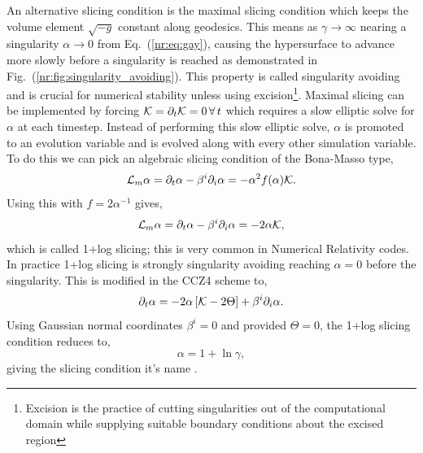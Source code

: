 An alternative slicing condition is the maximal slicing condition which keeps the volume element $\sqrt{-g}$ constant along geodesics. This means as $\gamma\rightarrow\infty$ nearing a singularity $\alpha\rightarrow0$ from Eq.~(\ref{nr:eq:gay}), causing the hypersurface to advance more slowly before a singularity is reached as demonstrated in Fig.~(\ref{nr:fig:singularity_avoiding}). This property is called singularity avoiding and is crucial for numerical stability unless using excision\footnote{Excision is the practice of cutting singularities out of the computational domain while supplying suitable boundary conditions about the excised region}. Maximal slicing can be implemented by forcing $\mathcal{K} = \partial_t \mathcal{K} = 0\,\forall \,t$ which requires a slow elliptic solve for $\alpha$ at each timestep. Instead of performing this slow elliptic solve, $\alpha$ is promoted to an evolution variable and is evolved along with every other simulation variable. To do this we can pick an algebraic slicing condition of the Bona-Masso type,
\begin{equation}\mathcal{L}_m \alpha = \partial_t \alpha - \beta^i \partial_i \alpha = -\alpha^2 f(\alpha)\mathcal{K}. \end{equation}
Using this with $f = 2\alpha^{-1}$ gives,
\begin{equation}\mathcal{L}_m \alpha = \partial_t \alpha - \beta^i \partial_i \alpha = -2\alpha \mathcal{K}, \label{nr:eq:1pluslog} \end{equation}
which is called 1+log slicing; this is very common in Numerical Relativity codes. In practice 1+log slicing is strongly singularity avoiding reaching $\alpha=0$ before the singularity. This is modified in the CCZ4 scheme to, 
\begin{equation}\partial_t \alpha = -2\alpha\left[ \mathcal{K}-2\Theta\right] + \beta^i \partial_i \alpha.\end{equation}
Using Gaussian normal coordinates $\beta^i=0$ and provided $\Theta=0$, the 1+log slicing condition reduces to, 
\begin{equation} \alpha = 1+ \ln \gamma,\end{equation}
giving the slicing condition it's name \cite{alcubierre2008introduction}.

